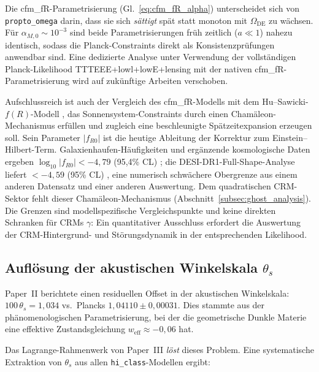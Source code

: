 \documentclass[11pt,a4paper]{article}
\begin{document}
Die cfm\_fR-Parametrisierung (Gl.~\ref{eq:cfm_fR_alpha}) unterscheidet sich von \texttt{propto\_omega} darin, dass sie sich \textit{s\"attigt} sp\"at statt monoton mit $\Omega_{\mathrm{DE}}$ zu w\"achsen. F\"ur $\alpha_{M,0} \sim 10^{-3}$ sind beide Parametrisierungen fr\"uh zeitlich ($a \ll 1$) nahezu identisch, sodass die Planck-Constraints direkt als Konsistenzpr\"ufungen anwendbar sind. Eine dedizierte Analyse unter Verwendung der vollst\"andigen Planck-Likelihood TTTEEE+lowl+lowE+lensing mit der nativen cfm\_fR-Parametrisierung wird auf zuk\"unftige Arbeiten verschoben.

Aufschlussreich ist auch der Vergleich des cfm\_fR-Modells mit dem Hu--Sawicki-$f(R)$-Modell \cite{HuSawicki2007}, das Sonnensystem-Constraints durch einen Chamäleon-Mechanismus erfüllen und zugleich eine beschleunigte Spätzeitexpansion erzeugen soll. Sein Parameter $|f_{R0}|$ ist die heutige Ableitung der Korrektur zum Einstein--Hilbert-Term. Galaxienhaufen-Häufigkeiten und ergänzende kosmologische Daten ergeben $\log_{10}|f_{R0}|<-4{,}79$ (95{,}4\% CL) \cite{Cataneo2015}; die DESI-DR1-Full-Shape-Analyse liefert $<-4{,}59$ (95\% CL) \cite{Gonzalez2026}, eine numerisch schwächere Obergrenze aus einem anderen Datensatz und einer anderen Auswertung. Dem quadratischen CRM-Sektor fehlt dieser Chamäleon-Mechanismus (Abschnitt~\ref{subsec:ghost_analysis}). Die Grenzen sind modellspezifische Vergleichspunkte und keine direkten Schranken für CRMs $\gamma$: Ein quantitativer Ausschluss erfordert die Auswertung der CRM-Hintergrund- und Störungsdynamik in der entsprechenden Likelihood.

\subsection{Aufl\"osung der akustischen Winkelskala $\theta_s$}
\label{subsec:theta_s}

Paper~II berichtete einen residuellen Offset in der akustischen Winkelskala: $100\,\theta_s = 1{,}034$ vs.\ Plancks $1{,}04110 \pm 0{,}00031$. Dies stammte aus der ph\"anomenologischen Parametrisierung, bei der die geometrische Dunkle Materie eine effektive Zustandsgleichung $w_{\mathrm{eff}} \approx -0{,}06$ hat.

Das Lagrange-Rahmenwerk von Paper~III \textit{l\"ost} dieses Problem. Eine systematische Extraktion von $\theta_s$ aus allen \texttt{hi\_class}-Modellen ergibt:
\end{document}
